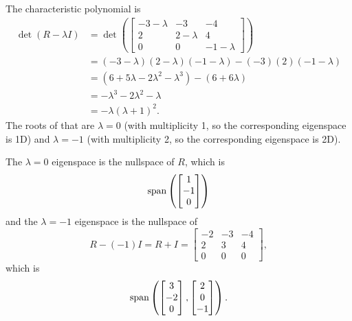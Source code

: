 \documentclass{article}
\begin{document}
\bigskip
\par
\begin{prob}
\end{prob}
The characteristic polynomial is
\begin{align*}
    \det (R - \lambda I) &= \det \left( \begin{bmatrix}
            -3-\lambda & -3 & -4 \\
            2 & 2 - \lambda & 4 \\
            0 & 0 & -1 - \lambda
    \end{bmatrix} \right) \\
                         &= (-3-\lambda)(2-\lambda)(-1-\lambda) - (-3)(2)(-1-\lambda) \\
                         &= (6+5\lambda-2\lambda^2-\lambda^3)-(6+6\lambda) \\
                         &= -\lambda^3-2\lambda^2-\lambda \\
                         &= -\lambda(\lambda+1)^2.
\end{align*}
The roots of that are $\lambda = 0$ (with multiplicity 1, so the corresponding eigenspace is 1D) and $\lambda = -1$ (with multiplicity 2, so the corresponding eigenspace is 2D).
\par
The $\lambda=0$ eigenspace is the nullspace of $R$, which is
\[ \operatorname{span} \left( \begin{bmatrix}
    1 \\
    -1 \\
    0
\end{bmatrix} \right) \]
and the $\lambda=-1$ eigenspace is the nullspace of
\[ R-(-1)I=R+I = \begin{bmatrix}
    -2 & -3 & -4 \\
    2 & 3 & 4 \\
    0 & 0 & 0
\end{bmatrix}, \]
which is
\[ \operatorname{span} \left( \begin{bmatrix}
    3 \\
    -2 \\
    0
\end{bmatrix}, \begin{bmatrix}
    2 \\
    0 \\
    -1
\end{bmatrix} \right). \]
\end{document}
